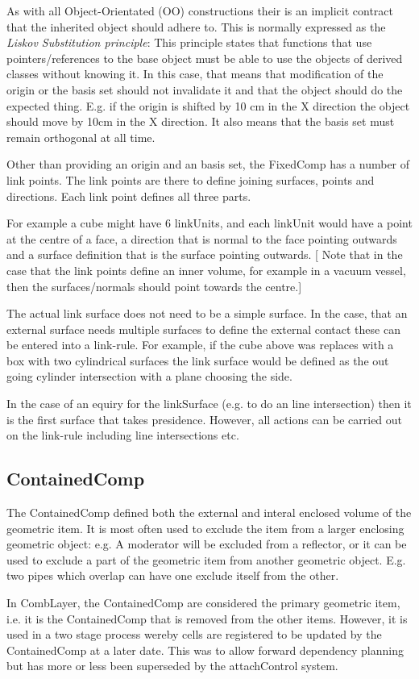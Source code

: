 As with all Object-Orientated (OO) constructions their is an implicit
contract that the inherited object should adhere to. This is normally
expressed as the {\it Liskov Substitution principle}: This principle
states that functions that use pointers/references to the base object
must be able to use the objects of derived classes without knowing
it. In this case, that means that modification of the origin or the
basis set should not invalidate it and that the object should do the
expected thing. E.g. if the origin is shifted by 10 cm in the X
direction the object should move by 10cm in the X direction. It also
means that the basis set must remain orthogonal at all time.

Other than providing an origin and an basis set, the FixedComp has a
number of link points. The link points are there to define joining
surfaces, points and directions. Each link point defines all three parts.

For example a cube might have 6 linkUnits, and each linkUnit would
have a point at the centre of a face, a direction that is normal to
the face pointing outwards and a surface definition that is the
surface pointing outwards. [ Note that in the case that the link
points define an inner volume, for example in a vacuum vessel, then
the surfaces/normals should point towards the centre.]

The actual link surface does not need to be a simple surface. In the
case, that an external surface needs multiple surfaces to define the
external contact these can be entered into a link-rule. For example,
if the cube above was replaces with a box with two cylindrical
surfaces the link surface would be defined as the out going cylinder
intersection with a plane choosing the side. 

In the case of an equiry for the linkSurface (e.g. to do an line
intersection) then it is the first surface that takes
presidence. However, all actions can be carried out on the link-rule
including line intersections etc.


\subsection{ContainedComp}

The ContainedComp defined both the external and interal enclosed
volume of the geometric item. It is most often used to exclude the
item from a larger enclosing geometric object: e.g. A moderator will
be excluded from a reflector, or it can be used to exclude a part of
the geometric item from another geometric object. E.g. two pipes which
overlap can have one exclude itself from the other. 

In CombLayer, the ContainedComp are considered the primary geometric
item, i.e. it is the ContainedComp that is removed from the other
items.  However, it is used in a two stage process wereby cells are
registered to be updated by the ContainedComp at a later date. This
was to allow forward dependency planning but has more or less been
superseded by the attachControl system.
